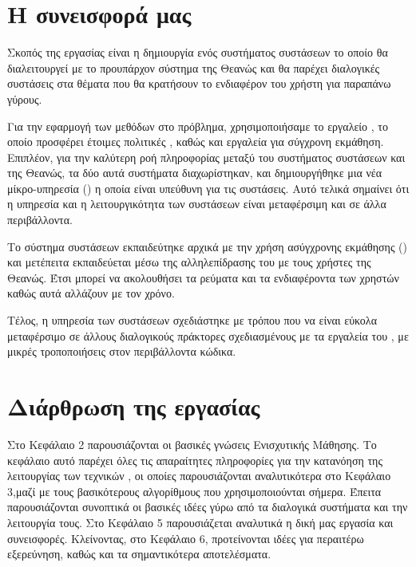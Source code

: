 \section{Η συνεισφορά μας}

Σκοπός της εργασίας είναι η δημιουργία ενός συστήματος συστάσεων το οποίο θα διαλειτουργεί με το προυπάρχον σύστημα της Θεανώς και θα παρέχει διαλογικές συστάσεις στα θέματα που θα κρατήσουν το ενδιαφέρον του χρήστη για παραπάνω γύρους.

Για την εφαρμογή των μεθόδων  στο πρόβλημα, χρησιμοποιήσαμε το εργαλείο , το οποίο προσφέρει έτοιμες πολιτικές , καθώς και εργαλεία για σύγχρονη εκμάθηση. Επιπλέον, για την καλύτερη ροή πληροφορίας μεταξύ του συστήματος συστάσεων και της Θεανώς, τα δύο αυτά συστήματα διαχωρίστηκαν, και δημιουργήθηκε μια νέα μίκρο-υπηρεσία () η οποία είναι υπεύθυνη για τις συστάσεις. Αυτό τελικά σημαίνει ότι η υπηρεσία και η λειτουργικότητα των συστάσεων είναι μεταφέρσιμη και σε άλλα περιβάλλοντα.

Το σύστημα συστάσεων εκπαιδεύτηκε αρχικά με την χρήση ασύγχρονης εκμάθησης () και μετέπειτα εκπαιδεύεται μέσω της αλληλεπίδρασης του με τους χρήστες της Θεανώς. Έτσι μπορεί να ακολουθήσει τα ρεύματα και τα ενδιαφέροντα των χρηστών καθώς αυτά αλλάζουν με τον χρόνο.

Τέλος, η υπηρεσία των συστάσεων σχεδιάστηκε με τρόπου που να είναι εύκολα μεταφέρσιμο σε άλλους διαλογικούς πράκτορες σχεδιασμένους με τα εργαλεία του , με μικρές τροποποιήσεις στον περιβάλλοντα κώδικα.

\section{Διάρθρωση της εργασίας}

Στο Κεφάλαιο 2 παρουσιάζονται οι βασικές γνώσεις Ενισχυτικής Μάθησης. Το κεφάλαιο αυτό παρέχει όλες τις απαραίτητες πληροφορίες για την κατανόηση της λειτουργίας των τεχνικών , οι οποίες παρουσιάζονται αναλυτικότερα στο Κεφάλαιο 3,μαζί με τους βασικότερους αλγορίθμους που χρησιμοποιούνται σήμερα. Έπειτα παρουσιάζονται συνοπτικά οι βασικές ιδέες γύρω από τα διαλογικά συστήματα και την λειτουργία τους. Στο Κεφάλαιο 5 παρουσιάζεται αναλυτικά η δική μας εργασία και συνεισφορές. Κλείνοντας, στο Κεφάλαιο 6, προτείνονται ιδέες για περαιτέρω εξερεύνηση, καθώς και τα σημαντικότερα αποτελέσματα.
